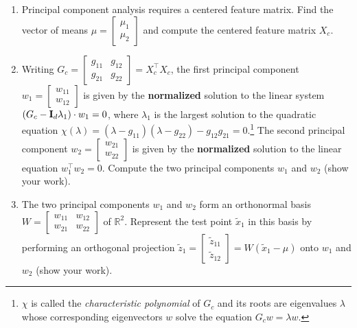 \documentclass{article}
\def\blu#1{{\color{blu}#1}}
\begin{document}
\begin{enumerate}
  \item Principal component analysis requires a centered feature matrix. \blu{Find the vector of means $\mu=\begin{bmatrix} \mu_1 \\ \mu_2 \end{bmatrix}$ and compute the centered feature matrix $X_c$.}
  \pagebreak
  \item Writing $G_c= \begin{bmatrix} g_{11} & g_{12}\\ g_{21} & g_{22} \end{bmatrix} = X_c^\top X_c$, the first principal component $w_1=\begin{bmatrix}w_{11} \\ w_{12}\end{bmatrix}$ is given by the {\bf normalized} solution to the linear system $(G_c-{\bf I}_d\lambda_1)\cdot w_1 = 0$, where $\lambda_1$ is the largest solution to the quadratic equation $\chi(\lambda)=(\lambda-g_{11})(\lambda-g_{22})-g_{12}g_{21}=0$.\footnote{$\chi$ is called the \emph{characteristic polynomial} of $G_c$ and its roots are eigenvalues $\lambda$ whose corresponding eigenvectors $w$ solve the equation $G_cw = \lambda w$.} The second principal component $w_2=\begin{bmatrix}w_{21} \\ w_{22}\end{bmatrix}$ is given by the {\bf normalized} solution to the linear equation $w_1^\top w_2 = 0$. \blu{Compute the two principal components $w_1$ and $w_2$ (show your work).}
  \item The two principal components $w_1$ and $w_2$ form an orthonormal basis $W = \begin{bmatrix}w_{11} & w_{12}\\w_{21} & w_{22}\end{bmatrix}$ of $\mathbb{R}^2$. \blu{Represent the test point $\tilde{x}_1$ in this basis by performing an orthogonal projection $\tilde{z}_1 = \begin{bmatrix} \tilde{z}_{11} \\ \tilde{z}_{12} \end{bmatrix} = W(\tilde{x}_1-\mu)$ onto $w_1$ and $w_2$ (show your work).}
  \pagebreak

\end{enumerate}
\end{document}
